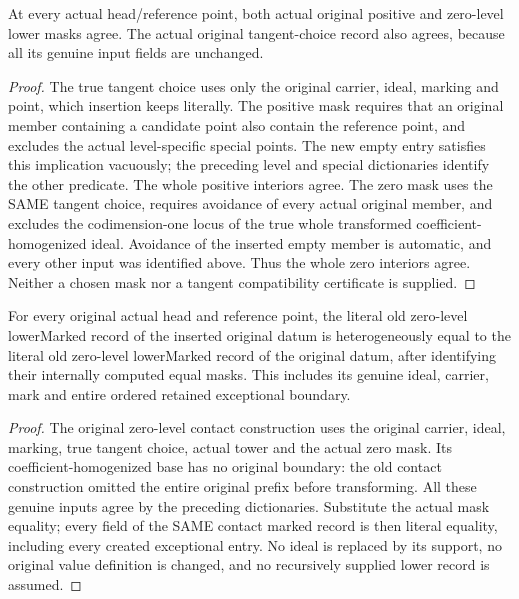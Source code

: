 \begin{lemma}
\label{hir:step-one-empty-insertion-masks}
\leanok
At every actual head/reference point, both actual original positive and zero-level lower masks agree. The actual original tangent-choice record also agrees, because all its genuine input fields are unchanged.
\end{lemma}
\begin{proof}
The true tangent choice uses only the original carrier, ideal, marking and point, which insertion keeps literally. The positive mask requires that an original member containing a candidate point also contain the reference point, and excludes the actual level-specific special points. The new empty entry satisfies this implication vacuously; the preceding level and special dictionaries identify the other predicate. The whole positive interiors agree. The zero mask uses the SAME tangent choice, requires avoidance of every actual original member, and excludes the codimension-one locus of the true whole transformed coefficient-homogenized ideal. Avoidance of the inserted empty member is automatic, and every other input was identified above. Thus the whole zero interiors agree. Neither a chosen mask nor a tangent compatibility certificate is supplied.
\end{proof}

\begin{theorem}
\label{hir:step-one-empty-insertion-zero-lower}
\leanok
For every original actual head and reference point, the literal old zero-level lowerMarked record of the inserted original datum is heterogeneously equal to the literal old zero-level lowerMarked record of the original datum, after identifying their internally computed equal masks. This includes its genuine ideal, carrier, mark and entire ordered retained exceptional boundary.
\end{theorem}
\begin{proof}
The original zero-level contact construction uses the original carrier, ideal, marking, true tangent choice, actual tower and the actual zero mask. Its coefficient-homogenized base has no original boundary: the old contact construction omitted the entire original prefix before transforming. All these genuine inputs agree by the preceding dictionaries. Substitute the actual mask equality; every field of the SAME contact marked record is then literal equality, including every created exceptional entry. No ideal is replaced by its support, no original value definition is changed, and no recursively supplied lower record is assumed.
\end{proof}

